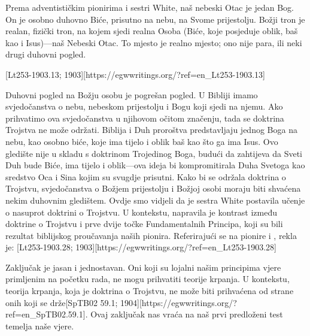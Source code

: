 Prema adventističkim pionirima i sestri White, naš nebeski Otac je jedan Bog. On je osobno duhovno Biće, prisutno na nebu, na Svome prijestolju. Božji tron je realan, fizički tron, na kojem sjedi realna Osoba (Biće, koje posjeduje oblik, baš kao i Isus)—naš Nebeski Otac. To mjesto je realno mjesto; ono nije para, ili neki drugi duhovni pogled.

[Lt253-1903.13; 1903][https://egwwritings.org/?ref=en\_Lt253-1903.13]

Duhovni pogled na Božju osobu je pogrešan pogled. U Bibliji imamo svjedočanstva o nebu, nebeskom prijestolju i Bogu koji sjedi na njemu. Ako prihvatimo ova svjedočanstva u njihovom očitom značenju, tada se doktrina Trojstva ne može održati. Biblija i Duh proroštva predstavljaju jednog Boga na nebu, kao osobno biće, koje ima tijelo i oblik baš kao što ga ima Isus. Ovo gledište nije u skladu s doktrinom Trojedinog Boga, budući da zahtijeva da Sveti Duh bude Biće, ima tijelo i oblik—ova ideja bi kompromitirala Duha Svetoga kao sredstvo Oca i Sina kojim su svugdje prisutni. Kako bi se održala doktrina o Trojstvu, svjedočanstva o Božjem prijestolju i Božjoj osobi moraju biti shvaćena nekim duhovnim gledištem. Ovdje smo vidjeli da je sestra White postavila učenje o  nasuprot doktrini o Trojstvu. U kontekstu, napravila je kontrast između doktrine o Trojstvu i prve dvije točke Fundamentalnih Principa, koji su bili rezultat biblijskog proučavanja naših pionira. Referirajući se na pionire i , rekla je: [Lt253-1903.28; 1903][https://egwwritings.org/?ref=en\_Lt253-1903.28]

Zaključak je jasan i jednostavan. Oni koji su lojalni našim principima vjere primljenim na početku rada, ne mogu prihvatiti teorije krpanja. U kontekstu, teorija krpanja, koja je doktrina o Trojstvu, ne može biti prihvaćena od strane onih koji se drže[SpTB02 59.1; 1904][https://egwwritings.org/?ref=en\_SpTB02.59.1]. Ovaj zaključak nas vraća na naš prvi predloženi test temelja naše vjere.
